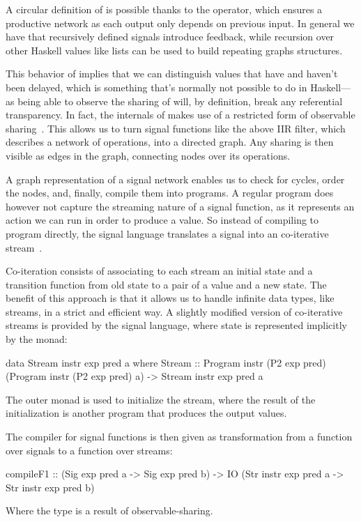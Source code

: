 \documentclass[../paper.tex]{subfiles}
\begin{document}
A circular definition of  is possible thanks to the  operator, which ensures a productive network as each output only depends on previous input. In general we have that recursively defined signals introduce feedback, while recursion over other Haskell values like lists can be used to build repeating graphs structures.

This behavior of  implies that we can distinguish values that have and haven't been delayed, which is something that's normally not possible to do in Haskell---as being able to observe the sharing of  will, by definition, break any referential transparency. In fact, the internals of  makes use of a restricted form of observable sharing~\cite{claessen1999, gill2009}. This allows us to turn signal functions like the above IIR filter, which describes a network of operations, into a directed graph. Any sharing is then visible as edges in the graph, connecting nodes over its operations.

A graph representation of a signal network enables us to check for cycles, order the nodes, and, finally, compile them into programs. A regular program does however not capture the streaming nature of a signal function, as it represents an action we can run in order to produce a value. So instead of compiling to program directly, the signal language translates a signal into an co-iterative stream~\cite{caspi1998}.

Co-iteration consists of associating to each stream an initial state and a transition function from old state to a pair of a value and a new state. The benefit of this approach is that it allows us to handle infinite data types, like streams, in a strict and efficient way. A slightly modified version of co-iterative streams is provided by the signal language, where state is represented implicitly by the  monad:

\begin{code}
data Stream instr exp pred a where
  Stream :: Program instr (P2 exp pred) (Program instr (P2 exp pred) a)
    -> Stream instr exp pred a
\end{code}

\noindent The outer monad is used to initialize the stream, where the result of the initialization is another program that produces the output values.

The compiler for signal functions is then given as transformation from a function over signals to a function over streams:

\begin{code}
compileF1 :: (Sig exp pred a -> Sig exp pred b)
  -> IO (Str instr exp pred a -> Str instr exp pred b)
\end{code}

\noindent Where the  type is a result of observable-sharing.
\end{document}
